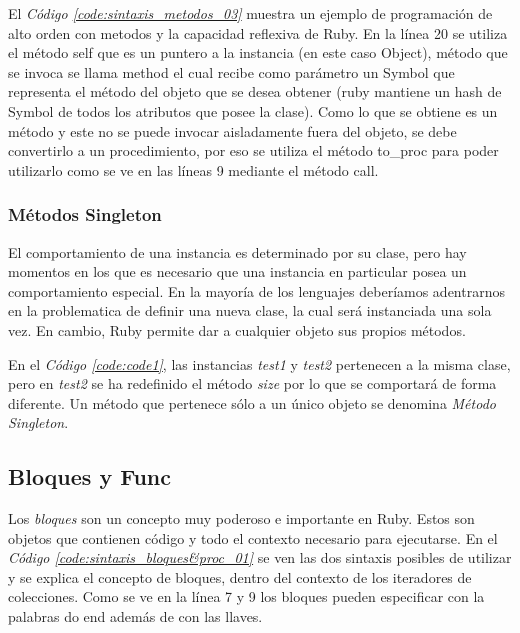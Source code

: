 \documentclass{article}
\newcommand{\refcode}[1]{\textit{Código \ref{#1}}}
\begin{document}
El \refcode{code:sintaxis_metodos_03} muestra un ejemplo de programación de alto orden con metodos y la capacidad reflexiva de Ruby. En la línea 20 se utiliza el método self que es un puntero a la instancia (en este caso Object), método que se invoca se llama method el cual recibe como parámetro un Symbol que representa el método del objeto que se desea obtener (ruby mantiene un hash de Symbol de todos los atributos que posee la clase). Como lo que se obtiene es un método y este no se puede invocar aisladamente fuera del objeto, se debe convertirlo a un procedimiento, por eso se utiliza el método to\_proc para poder utilizarlo como se ve en las líneas 9 mediante el método call.


 
\bigskip



\subsubsection{Métodos Singleton}

	El comportamiento de una instancia es determinado por su clase, pero hay momentos en los que es necesario que una instancia en particular posea un comportamiento especial. En la mayoría de los lenguajes deberíamos adentrarnos en la problematica de definir una nueva clase, la cual será instanciada una sola vez. En cambio, Ruby permite dar a cualquier objeto sus propios métodos.

 
\bigskip

	En el \refcode{code:code1}, las instancias \textit{test1} y \textit{test2} pertenecen a la misma clase, pero en \textit{test2} se ha redefinido el método \textit{size} por lo que se comportará de forma diferente. Un método que pertenece sólo a un único objeto se denomina \textit{Método Singleton}.
\bigskip



\subsection{Bloques y Func}

Los \textit{bloques} son un concepto muy poderoso e importante en Ruby. Estos son objetos que contienen código y todo el contexto necesario para ejecutarse.
En el \refcode{code:sintaxis_bloques&proc_01} se ven las dos sintaxis posibles de utilizar y se explica el concepto de bloques, dentro del contexto de los iteradores de colecciones. Como se ve en la línea 7 y 9 los bloques pueden especificar con la palabras do end además de con las llaves.
 
\bigskip
\end{document}
